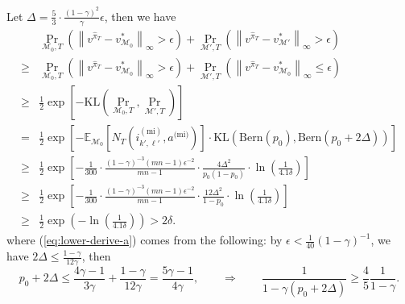 \documentclass[12pt]{article}
\begin{document}
Let $\Delta = \frac{5}{3} \cdot \frac{(1-\gamma)^2}{\gamma} \epsilon$, then we have
\begin{subequations}
    \begin{align}
    & \Pr_{\mathcal{M}_0,T} \left( \left\| v^{\hat{\pi}_T} - v^*_{\mathcal{M}_0} \right \|_{\infty}  >\epsilon \right) + \Pr_{\mathcal{M}',T} \left( \left\| v^{\hat{\pi}_T} - v^*_{\mathcal{M}'} \right \|_{\infty}  >\epsilon \right) \nonumber \\
    \ge  & \Pr_{\mathcal{M}_0,T} \left( \left\| v^{\hat{\pi}_T} - v^*_{\mathcal{M}_0} \right \|_{\infty}  >\epsilon \right) + \Pr_{\mathcal{M}',T} \left( \left\| v^{\hat{\pi}_T} - v^*_{\mathcal{M}_0} \right \|_{\infty} \le \epsilon \right) \label{eq:lower-derive-a} \\
    \ge & \frac{1}{2} \exp \left[-\text{KL}\left(\Pr_{\mathcal{M}_0,T},\Pr_{\mathcal{M}',T} \right) \right] \label{eq:lower-derive-b}\\
    = & \frac{1}{2} \exp \left[ - \mathbb{E}_{\mathcal{M}_0} [N_T(i^{(\text{mi})}_{k',\ell'},a^{\text{(mi)}})]\cdot\text{KL}\left(\text{Bern}\left( p_0\right),\text{Bern}\left( p_0 + 2 \Delta\right)\right) \right] \label{eq:lower-derive-c}\\
    \ge & \frac{1}{2} \exp \left[-\frac{1}{300} \cdot \frac{(1-\gamma)^{-3} (mn-1) \epsilon^{-2}}{mn-1} \cdot \frac{4 \Delta^2}{p_0(1-p_0)} \cdot \ln\left(\frac{1}{4.1\delta} \right)\right] \label{eq:lower-derive-d} \\
    \ge & \frac{1}{2} \exp \left[-\frac{1}{300} \cdot \frac{(1-\gamma)^{-3} (mn-1) \epsilon^{-2}}{mn-1} \cdot \frac{12 \Delta^2}{1-p_0}\cdot \ln\left(\frac{1}{4.1\delta}\right)\right]  \label{eq:lower-derive-e} \\
    \ge & \frac{1}{2} \exp\left(- \ln\left(\frac{1}{4.1\delta}\right)\right) > 2 \delta. \label{eq:lower-derive-f}
    \end{align}
    \label{eq:lower-derive}
\end{subequations}
where (\ref{eq:lower-derive-a}) comes from the following: by $\epsilon < \frac{1}{40} (1-\gamma)^{-1}$, we have $2 \Delta \le \frac{1 - \gamma}{12 \gamma}$, then
\begin{equation*}
    p_0 + 2 \Delta \le  \frac{4 \gamma-1}{3 \gamma} + \frac{1 - \gamma}{12 \gamma} = \frac{5\gamma - 1}{4 \gamma}, \qquad \Rightarrow \qquad  \frac{1}{1 - \gamma(p_0+2\Delta)} \ge \frac{4}{5} \frac{1}{1-\gamma}.
\end{equation*}
\end{document}
